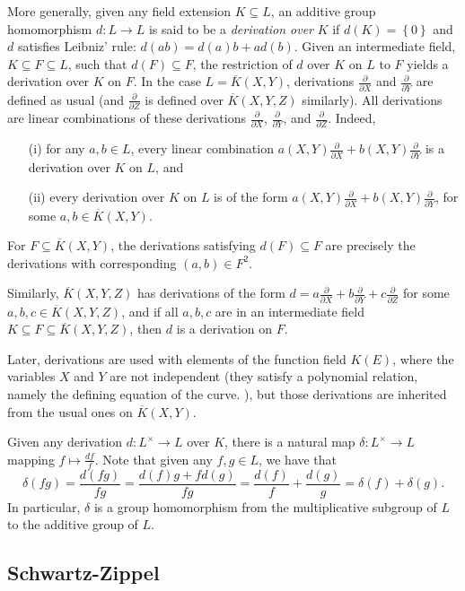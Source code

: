 \documentclass[11pt,letterpaper]{article}
\newcommand{\dX}{\frac{\partial}{\partial X}}
\newcommand{\dY}{\frac{\partial}{\partial Y}}
\newcommand{\dZ}{\frac{\partial}{\partial Z}}
\theoremstyle{definition}
\newcommand{\6}{\mathbf}
\newcommand{\7}{\mathcal}
\begin{document}
More generally, given any field extension $K \subseteq L$, an additive group homomorphism $d: L \to L$ is said to be a \textit{derivation over} $K$ if $d(K) = \left\{0\right\}$ and $d$ satisfies Leibniz' rule: $d(ab) = d(a)b + ad(b)$. Given an intermediate field, $K \subseteq F \subseteq L$, such that $d(F) \subseteq F$, the restriction of $d$ over $K$ on $L$ to $F$ yields a derivation over $K$ on $F$.  In the case $L=\overline{K}(X,Y)$, derivations $\dX$ and $\dY$ are defined as usual (and $\dZ$ is defined over $\overline{K}(X,Y,Z)$ similarly).
All derivations are linear combinations of these derivations $\dX$, $\dY$, and $\dZ$. Indeed, 
\begin{itemize}
    \item[(i)] for any $a, b \in L$, every linear combination $a(X,Y) \dX + b(X,Y) \dY$ is a derivation over $K$ on $L$, and 
    \item[(ii)] every derivation over $K$ on $L$ is of the form $a(X,Y) \dX + b(X,Y) \dY$, for some $a, b \in \overline{K}(X,Y)$. 
\end{itemize}
For $F \subseteq \overline{K}(X,Y)$, the  derivations satisfying $d(F) \subseteq F$ are precisely the derivations with corresponding $(a, b) \in F^2$.

Similarly, $\overline{K}(X,Y,Z)$ has derivations of the form $d=a\dX + b\dY + c\dZ$ for some $a, b, c \in \overline{K}(X,Y,Z)$, and if all $a, b, c$ are in an intermediate field $K \subseteq F \subseteq \overline{K}(X,Y,Z)$, then $d$ is a derivation on $F$. 

Later, derivations are used with elements of the function field $K(E)$, where the variables $X$ and $Y$ are not independent (they satisfy a polynomial relation, namely the defining equation of the curve. \cite{bassapersonal}), but those derivations are inherited from the usual ones on $\overline{K}(X,Y)$.

Given any derivation $d:L^\times \to L$ over $K$, there is a natural map $\delta:L^\times \to L$ mapping $f \mapsto \frac{df}{f}$. Note that given any $f, g \in L$, we have that 
$$ \delta(fg) = \frac{d(fg)}{fg} = \frac{d(f)g + fd(g)}{fg} = \frac{d(f)}{f} + \frac{d(g)}{g} = \delta(f) + \delta(g).$$
In particular, $\delta$ is a group homomorphism from the multiplicative subgroup of $L$ to the additive group of $L$.


\subsection{Schwartz-Zippel}
\end{document}
